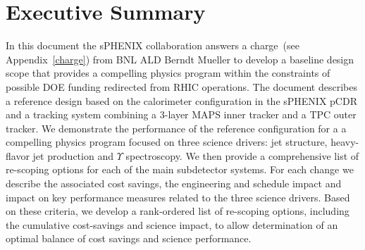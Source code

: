 \section*{Executive Summary}
\label{executive_summary}
\setcounter{page}{1}

\nocite{*}

In this document the sPHENIX collaboration answers a charge~(see
Appendix~\ref{charge}) from BNL ALD Berndt Mueller to develop
a baseline design scope that provides a compelling physics program
within the constraints of possible DOE funding redirected from 
RHIC operations. The document describes a reference design based
on the calorimeter configuration in the sPHENIX pCDR and a tracking system
combining a 3-layer MAPS inner tracker and a TPC outer tracker. We
demonstrate the performance of the reference configuration for a
a compelling physics program focused on three science drivers: jet structure,
heavy-flavor jet production and $\Upsilon$ spectroscopy. 
We then provide a comprehensive list of re-scoping options for each
of the main subdetector systems. For each change we describe the associated
cost savings, the engineering and schedule impact and impact on 
key performance measures related to the three science 
drivers. Based on these criteria, we develop a 
rank-ordered list of re-scoping options, including the 
cumulative cost-savings and science impact, to allow determination
of an optimal balance of cost savings and science performance.


